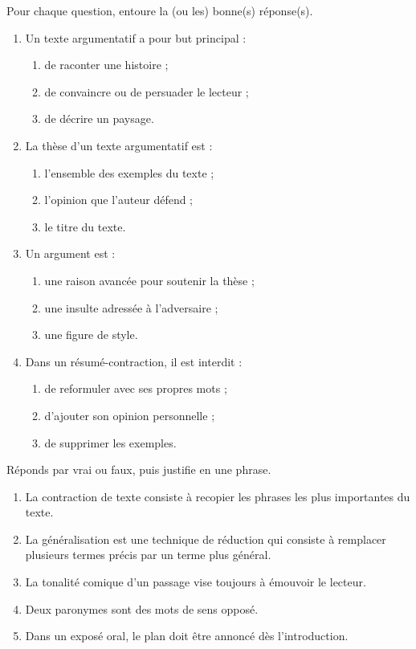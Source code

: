 \documentclass[11pt]{article}
\newcommand{\cle}[1]{{\popxbold\color{popdark}#1}}
\begin{document}
\begin{exercice}
Pour chaque question, entoure la (ou les) bonne(s) réponse(s).
\begin{enumerate}
\item Un texte argumentatif a pour but principal :
\begin{enumerate}
\item[a)] de raconter une histoire ;
\item[b)] de convaincre ou de persuader le lecteur ;
\item[c)] de décrire un paysage.
\end{enumerate}
\item La \cle{thèse} d'un texte argumentatif est :
\begin{enumerate}
\item[a)] l'ensemble des exemples du texte ;
\item[b)] l'opinion que l'auteur défend ;
\item[c)] le titre du texte.
\end{enumerate}
\item Un \cle{argument} est :
\begin{enumerate}
\item[a)] une raison avancée pour soutenir la thèse ;
\item[b)] une insulte adressée à l'adversaire ;
\item[c)] une figure de style.
\end{enumerate}
\item Dans un résumé-contraction, il est interdit :
\begin{enumerate}
\item[a)] de reformuler avec ses propres mots ;
\item[b)] d'ajouter son opinion personnelle ;
\item[c)] de supprimer les exemples.
\end{enumerate}
\end{enumerate}
\end{exercice}

\begin{exercice}
Réponds par vrai ou faux, puis justifie en une phrase.
\begin{enumerate}
\item La contraction de texte consiste à recopier les phrases les plus importantes du texte.
\item La généralisation est une technique de réduction qui consiste à remplacer plusieurs termes précis par un terme plus général.
\item La tonalité comique d'un passage vise toujours à émouvoir le lecteur.
\item Deux paronymes sont des mots de sens opposé.
\item Dans un exposé oral, le plan doit être annoncé dès l'introduction.
\end{enumerate}
\end{exercice}
\end{document}
